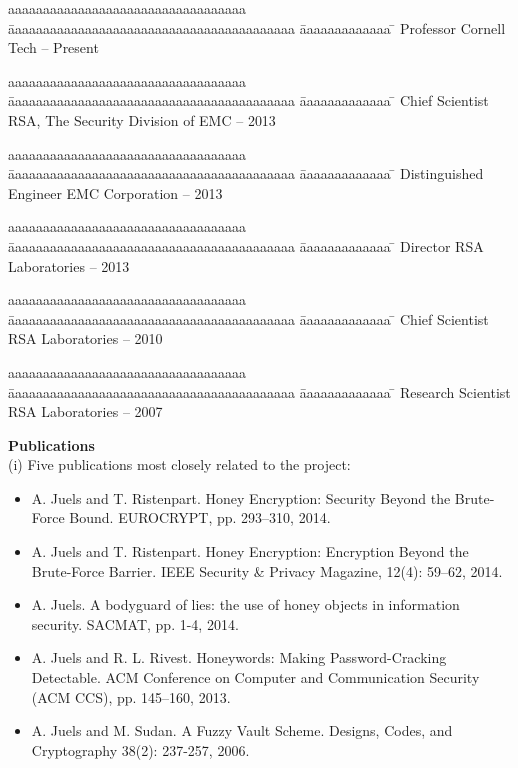 \documentclass[11pt]{article}
\begin{document}
\vspace{-1mm}
\begin{tabbing}
aaaaaaaaaaaaaaaaaaaaaaaaaaaaaaaaaa \= aaaaaaaaaaaaaaaaaaaaaaaaaaaaaaaaaaaaaaaaa \= aaaaaaaaaaaaa \= \kill
Professor \> Cornell Tech  -- Present 
\end{tabbing}
\vspace{-5mm}
\begin{tabbing}
aaaaaaaaaaaaaaaaaaaaaaaaaaaaaaaaaa \= aaaaaaaaaaaaaaaaaaaaaaaaaaaaaaaaaaaaaaaaa \= aaaaaaaaaaaaa \= \kill
{Chief Scientist} \> RSA, The Security Division of EMC -- 2013
\end{tabbing}
\vspace{-8mm}
\begin{tabbing}
aaaaaaaaaaaaaaaaaaaaaaaaaaaaaaaaaa \= aaaaaaaaaaaaaaaaaaaaaaaaaaaaaaaaaaaaaaaaa \= aaaaaaaaaaaaa \= \kill
{Distinguished Engineer} \> EMC Corporation  -- 2013
\end{tabbing}
\vspace{-8mm}
\begin{tabbing}
aaaaaaaaaaaaaaaaaaaaaaaaaaaaaaaaaa \= aaaaaaaaaaaaaaaaaaaaaaaaaaaaaaaaaaaaaaaaa \= aaaaaaaaaaaaa \= \kill
{Director} \> RSA Laboratories  --  2013 
\end{tabbing}
\vspace{-8mm}
\begin{tabbing}
aaaaaaaaaaaaaaaaaaaaaaaaaaaaaaaaaa \= aaaaaaaaaaaaaaaaaaaaaaaaaaaaaaaaaaaaaaaaa \= aaaaaaaaaaaaa \= \kill
Chief Scientist \> RSA Laboratories  --  2010  
\end{tabbing}
\vspace{-8mm}
\begin{tabbing}
aaaaaaaaaaaaaaaaaaaaaaaaaaaaaaaaaa \= aaaaaaaaaaaaaaaaaaaaaaaaaaaaaaaaaaaaaaaaa \= aaaaaaaaaaaaa \= \kill
Research Scientist \> RSA Laboratories  -- 2007 
\end{tabbing}



\bigskip

\noindent
{\Large {\bf Publications}}
\\

\noindent (i) Five publications most closely related to the project:
\vspace{-2mm}
\begin{itemize}
\item A. Juels and T. Ristenpart. Honey Encryption: Security Beyond the Brute-Force Bound. EUROCRYPT, pp. 293--310, 2014.
\item A. Juels and T. Ristenpart. Honey Encryption: Encryption Beyond the Brute-Force Barrier. IEEE Security \& Privacy Magazine, 12(4): 59--62, 2014.
\item  A. Juels. A bodyguard of lies: the use of honey objects in information security. SACMAT, pp. 1-4, 2014.
\item A. Juels and R. L. Rivest. Honeywords: Making Password-Cracking Detectable. ACM Conference on Computer and Communication Security (ACM CCS), pp. 145--160, 2013.
\item A. Juels and M. Sudan. A Fuzzy Vault Scheme. Designs, Codes, and Cryptography 38(2): 237-257, 2006.
\end{itemize}
\end{document}
